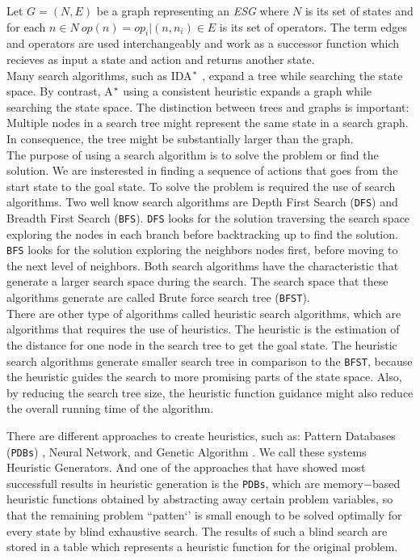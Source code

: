 Let $G = (N,E)$ be a graph representing an \textit{ESG} where $N$ is its set of states and for each $n \in N\  op(n) = {op_{i}|(n, n_i) \in E}$ is its set of operators. The term edges and operators are used interchangeably and work as a successor function which recieves as input a state and action and returns another state.\\

Many search algorithms, such as IDA$\sp{*}$ \cite{Korf85ida}, expand a tree while searching the state space. By contrast, A$\sp{*}$ using a consistent heuristic expands a graph while searching the state space. The distinction between trees and graphs is important: Multiple nodes in a search tree might represent the same state in a search graph. In consequence, the tree might be substantially larger than the graph.\\

The purpose of using a search algorithm is to solve the problem or find the solution. We are insterested in finding a sequence of actions that goes from the start state to the goal state. To solve the problem is required the use of search algorithms. Two well know search algorithms are Depth First Search (\texttt{DFS}) and Breadth First Search (\texttt{BFS}). \texttt{DFS} looks for the solution traversing the search space exploring the nodes in each branch before backtracking up to find the solution. \texttt{BFS} looks for the solution exploring the neighbors nodes first, before moving to the next level of neighbors. Both search algorithms have the characteristic that generate a larger search space during the search. The search space that these algorithms generate are called Brute force search tree (\texttt{BFST}).\\

There are other type of algorithms called heuristic search algorithms, which are algorithms that requires the use of heuristics. The heuristic is the estimation of the distance for one node in the search tree to get the goal state. The heuristic search algorithms generate smaller search tree in comparison to the \texttt{BFST}, because the heuristic guides the search to more promising parts of the state space. Also, by reducing the search tree size, the heuristic function guidance might also reduce the overall running time of the algorithm.

There are different approaches to create heuristics, such as: Pattern Databases (\texttt{PDBs}) \cite{haslum2007domain}, Neural Network, and Genetic Algorithm \cite{edelkamp2007automated}. We call these systems Heuristic Generators. And one of the approaches that have showed most successfull results in heuristic generation is the \texttt{PDBs}, which are memory$-$based heuristic functions obtained by abstracting away certain problem variables, so that the remaining problem ``patten‘’ is small enough to be solved optimally for every state by blind exhaustive search. The results of such a blind search are stored in a table which represents a heuristic function for the original problem.\\

